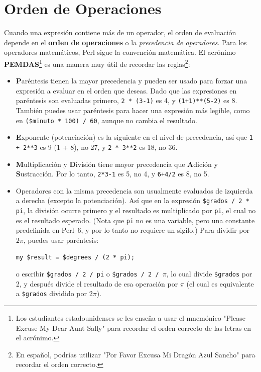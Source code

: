 \section{Orden de Operaciones}

Cuando una expresión contiene más de un operador, el orden 
de evaluación depende en el {\bf orden de operaciones} o 
la \emph{precedencia de operadores}. Para los operadores matemáticos,
Perl sigue la convención matemática. El acrónimo {\bf PEMDAS}\footnote{Los estudiantes 
estadounidenses se les enseña a usar el mnemónico 
"Please Excuse My Dear Aunt Sally" para recordar el orden 
correcto de las letras en el acrónimo.} es una manera muy útil de recordar
las reglas\footnote{En español, podrías utilizar "Por Favor Excusa Mi Dragón Azul Sancho" para
recordar el orden correcto.}:
 
\begin{itemize}

\item {\bf P}aréntesis tienen la mayor precedencia y pueden ser 
usado para forzar una expresión a evaluar en el orden que deseas.
Dado que las expresiones en paréntesis son evaluadas primero, 
{\tt 2 * (3-1)} es 4, y {\tt (1+1)**(5-2)} es 8.  También puedes usar 
paréntesis para hacer una expresión más legible, como en {\tt (\$minuto * 100) / 60},
aunque no cambia el resultado.

\item {\bf E}xponente (potenciación) es la siguiente en el nivel de precedencia, así
que {\tt 1 + 2**3} es 9 (1 + 8), no 27, y {\tt 2 * 3**2} es 18, no 36.

\item {\bf M}ultiplicación y {\bf D}ivisión tiene mayor precedencia
  que {\bf A}dición y {\bf S}ustracción.  Por lo tanto, {\tt 2*3-1} es 5, no
  4, y {\tt 6+4/2} es 8, no 5.

\item Operadores con la misma precedencia son usualmente evaluados
de izquierda a derecha (excepto la potenciación). Así que en la expresión
{\tt \$grados / 2 * pi}, la división ocurre primero y el resultado 
es multiplicado por {\tt pi}, el cual no es el resultado esperado. (Nota que 
{\tt pi} no es una variable, pero una constante predefinida en Perl~6, y por lo tanto
no requiere un sigilo.) Para dividir por $2 \pi$, puedes usar paréntesis: 
  
\begin{verbatim}
my $result = $degrees / (2 * pi);  
\end{verbatim}  
 
o escribir 
  {\tt \$grados / 2 / pi} o {\tt \$grados / 2 / $\pi$}, lo cual
  divide \verb'$grados' por 2, y después divide el resultado de esa
  operación por $\pi$ (el cual es equivalente a \verb'$grados'
  dividido por $2 \pi$).

\end{itemize}

